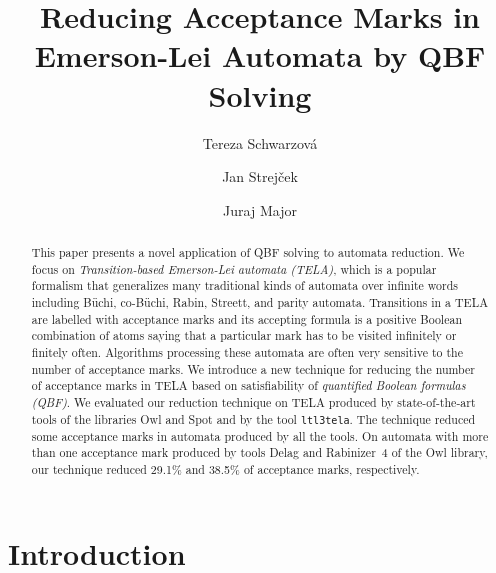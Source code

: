 \documentclass[a4paper,UKenglish,cleveref,autoref,thm-restate]{lipics-v2021}
\title{Reducing Acceptance Marks in Emerson-Lei Automata by QBF Solving}
\author{Tereza Schwarzov\'{a}}{%
  Masaryk University, Brno, Czech Republic}{xschwar3@mail.muni.cz}{}{}
\author{Jan Strej\v{c}ek}{%
  Masaryk University, Brno, Czech Republic}{strejcek@fi.muni.cz}{https://orcid.org/0000-0001-5873-403X}{}
\author{Juraj Major}{%
  Masaryk University, Brno, Czech Republic}{major@fi.muni.cz}{}{}
\begin{document}
\maketitle


\begin{abstract}
  This paper presents a novel application of QBF solving to automata
  reduction. We focus on \emph{Transition-based Emerson-Lei automata
    (TELA)}, which is a popular formalism that generalizes many
  traditional kinds of automata over infinite words including Büchi,
  co-Büchi, Rabin, Streett, and parity automata. Transitions in a TELA
  are labelled with acceptance marks and its accepting formula is a
  positive Boolean combination of atoms saying that a particular mark
  has to be visited infinitely or finitely
  often. %
  Algorithms processing these automata are often very sensitive to the
  number of %
  acceptance marks. We introduce a new technique for reducing the
  number of %
  acceptance marks in TELA based on satisfiability of \emph{quantified
    Boolean formulas (QBF)}.
  We evaluated
  our reduction technique on TELA produced by state-of-the-art tools
  of the libraries Owl and Spot and by the tool \texttt{ltl3tela}. The
  technique reduced some acceptance marks in automata produced by all
  the tools. On automata with more than one acceptance mark produced
  by tools Delag and Rabinizer~4 of the Owl library, our technique reduced
  29.1\% and 38.5\% of acceptance marks, respectively.
\end{abstract}



\section{Introduction}
\end{document}
